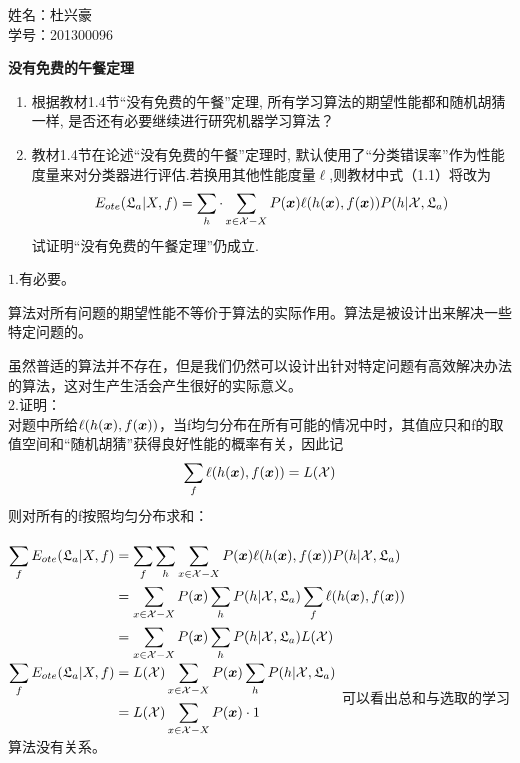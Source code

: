 \documentclass[answers]{exam}  %
\begin{document}
\Large
\noindent 
姓名：杜兴豪 \\
学号：201300096 \\
\begin{questions}
\question [20] \textbf{没有免费的午餐定理}

\begin{enumerate}
    \item 根据教材1.4节“没有免费的午餐”定理, 所有学习算法的期望性能都和随机胡猜一样, 是否还有必要继续进行研究机器学习算法？
    \item 教材1.4节在论述“没有免费的午餐”定理时, 默认使用了“分类错误率”作为性能度量来对分类器进行评估.若换用其他性能度量$\ell$,则教材中式（1.1）将改为
    \begin{equation}
        E_{ote}(\mathfrak{L}_a|X,f)=\sum_h \cdot\sum_{x\in\mathcal{X}-X}P({\boldsymbol{x}})\ell(h({\boldsymbol{x}}),f({\boldsymbol{x}}))P(h|\mathcal{X},\mathfrak{L}_a)
    \end{equation}
    试证明“没有免费的午餐定理”仍成立.
\end{enumerate}
	\begin{solution}
		$1.$有必要。
		
		算法对所有问题的期望性能不等价于算法的实际作用。算法是被设计出来解决一些特定问题的。
		
		虽然普适的算法并不存在，但是我们仍然可以设计出针对特定问题有高效解决办法的算法，这对生产生活会产生很好的实际意义。
		\\$2.$证明：\\
		对题中所给$\ell(h({\boldsymbol{x}}),f({\boldsymbol{x}}))$，当f均匀分布在所有可能的情况中时，其值应只和f的取值空间和“随机胡猜”获得良好性能的概率有关，因此记\\
		$$\sum_{f}\ell(h({\boldsymbol{x}}),f({\boldsymbol{x}}))=L(\mathcal X)\\$$
		则对所有的f按照均匀分布求和：\\\\ 
		$
		\begin{aligned}
			\sum_{f}E_{ote}(\mathfrak{L}_{a}|X,f)&=\sum_{f}\sum_{h}\sum_{x\in\mathcal X-X}P({\boldsymbol{x}})\ell(h({\boldsymbol{x}}),f({\boldsymbol{x}}))P(h|\mathcal X,\mathfrak L_a)\\
			&=\sum_{x\in\mathcal X-X}P({\boldsymbol{x}})\sum_{h}P(h|\mathcal X,\mathfrak L_a)\sum_{f}\ell(h({\boldsymbol{x}}),f({\boldsymbol{x}}))\\
			&=\sum_{x\in\mathcal X-X}P({\boldsymbol{x}})\sum_{h}P(h|\mathcal X,\mathfrak L_a)L(\mathcal X)\\
		\end{aligned}\\
		$
		$
		\begin{aligned}
			\sum_{f}E_{ote}(\mathfrak{L}_{a}|X,f)&=L(\mathcal X)\sum_{x\in\mathcal X-X}P({\boldsymbol{x}})\sum_{h}P(h|\mathcal X,\mathfrak L_a)\\
			&=L(\mathcal X)\sum_{x\in\mathcal X-X}P({\boldsymbol{x}})\cdot 1\\
		\end{aligned}\\\\
		$
		可以看出总和与选取的学习算法没有关系。
	\end{solution}



\end{questions}
\end{document}
